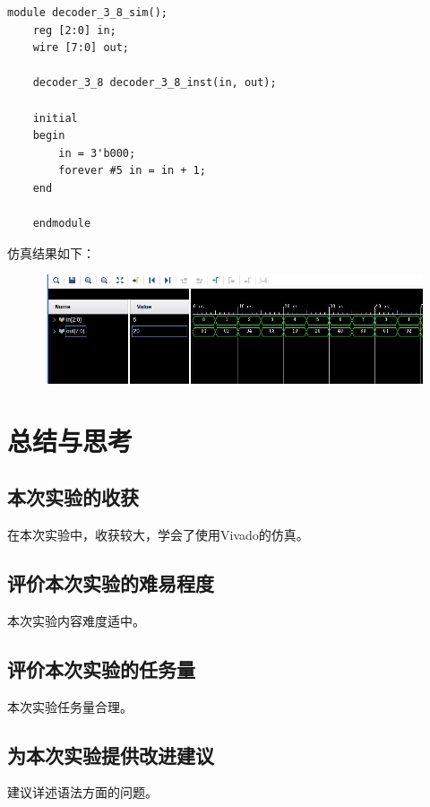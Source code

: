 \documentclass[UTF8]{article}
\begin{document}
	\begin{lstlisting}[name=对应仿真文件]
	module decoder_3_8_sim();
	reg [2:0] in;
	wire [7:0] out;
	
	decoder_3_8 decoder_3_8_inst(in, out);
	
	initial
	begin
		in = 3'b000;
		forever #5 in = in + 1;
	end
	
	endmodule
	\end{lstlisting}
	仿真结果如下：\par
	\begin{figure}[H]
		\centering
		\includegraphics[width=1\linewidth]{e4.jpg}
		\label{e4}
	\end{figure}\par
	
	
	
	
	\section{总结与思考}	
	\subsection{本次实验的收获}
	在本次实验中，收获较大，学会了使用Vivado的仿真。\par
	
	\subsection{评价本次实验的难易程度}
	本次实验内容难度适中。\par
	
	\subsection{评价本次实验的任务量}
	本次实验任务量合理。\par
	
	\subsection{为本次实验提供改进建议}
	建议详述语法方面的问题。
	
\end{document}
